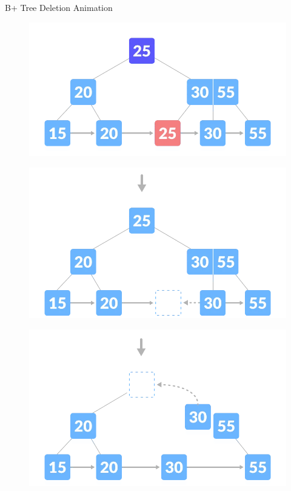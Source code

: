 \documentclass{beamer}
\begin{document}
\begin{frame}{B+ Tree Deletion Animation}
\begin{table}[h]
\begin{overprint}
\begin{figure}
        \end{figure}
        \begin{figure}
            \centering
              \includegraphics[scale=0.4]{Images/deletion-5.1.png}
        \end{figure}
        \begin{figure}
             \centering
             \includegraphics[scale=0.4]{Images/deletion-5.2.png}
        \end{figure}
        \begin{figure}
             \centering
             \includegraphics[scale=0.4]{Images/deletion-5.3.png}

\end{figure}
\end{overprint}
\end{table}
\end{frame}
\end{document}
